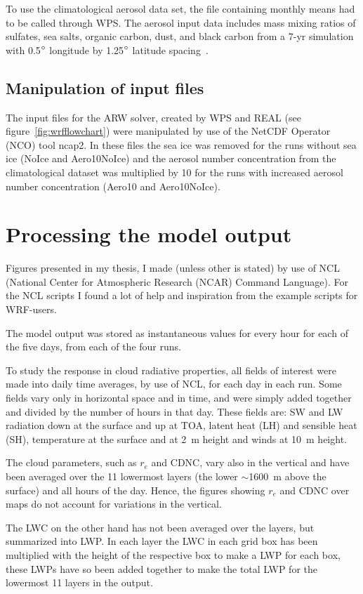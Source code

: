 To use the climatological aerosol data set, the file containing monthly means had to be called through WPS. The aerosol input data includes mass mixing ratios of sulfates, sea salts, organic carbon, dust, and black carbon from a 7-yr simulation with 0.5$\degree$ longitude by 1.25$\degree$ latitude spacing~\citep{Thompson2014}.

\subsection{Manipulation of input files}
The input files for the ARW solver, created by WPS and REAL (see figure~\ref{fig:wrfflowchart}) were manipulated by use of the NetCDF Operator (NCO) tool ncap2. In these files the sea ice was removed for the runs without sea ice (NoIce and Aero10NoIce) and the aerosol number concentration from the climatological dataset was multiplied by 10 for the runs with increased aerosol number concentration (Aero10 and Aero10NoIce).

\section{Processing the model output}
Figures presented in my thesis, I made (unless other is stated) by use of NCL (National Center for Atmospheric Research (NCAR) Command Language). For the NCL scripts I found a lot of help and inspiration from the example scripts for WRF-users.%

The model output was stored as instantaneous values for every hour for each of the five days, from each of the four runs. 

To study the response in cloud radiative properties, all fields of interest were made into daily time averages, by use of NCL, for each day in each run. Some fields vary only in horizontal space and in time, and were simply added together and divided by the number of hours in that day. These fields are: SW and LW radiation down at the surface and up at TOA, latent heat (LH) and sensible heat (SH), temperature at the surface and at 2~m height and winds at 10~m height.

The cloud parameters, such as $r_e$ and CDNC, vary also in the vertical and have been averaged over the 11 lowermost layers (the lower $\sim$1600~m above the surface) and all hours of the day. Hence, the figures showing $r_e$ and CDNC over maps do not account for variations in the vertical.

The LWC on the other hand has not been averaged over the layers, but summarized into LWP. In each layer the LWC in each grid box has been multiplied with the height of the respective box to make a LWP for each box, these LWPs have so been added together to make the total LWP for the lowermost 11 layers in the output.